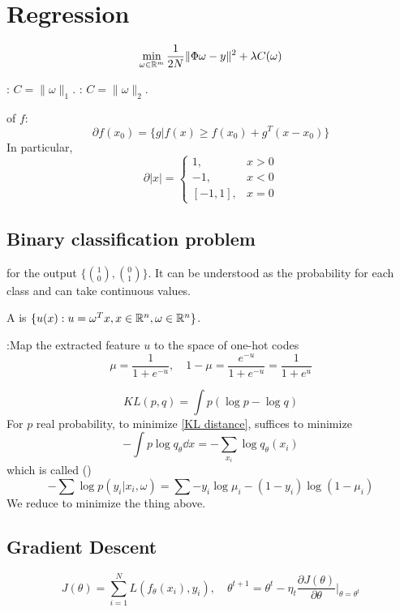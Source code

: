 \section{Regression}
\begin{equation}\label{Lasso}
    \min_{\omega\in \mathbb R^m}\frac{1}{2N}\|\Phi\omega-y\|^2+\lambda C(\omega)
\end{equation}

:  $ C=\|\omega\|_1 $. : $ C=\|\omega\|_2 $.

 of  $ f $:
\[\partial f(x_0)=\{g|f(x) \geq f(x_0)+g^T(x-x_0)\}\] 
In particular, 
\[\partial |x|=\begin{cases}
    1, & x>0\\
    -1, & x<0\\
    [-1,1], & x=0
\end{cases}\]

\subsection{Binary classification problem}
 for the output  $ \{\binom{1}{0},\binom{0}{1} \} $. It can be understood as the probability for each class  and can take continuous values.

A  is  $ \{u(x):u=\omega^Tx,x\in \mathbb R^n,\omega\in \mathbb R^n\} $.

:Map the extracted feature  $ u $ to the space of one-hot codes 
\[\mu=\frac{1}{1+e^{-u}},\quad 1-\mu=\frac{e^{-u}}{1+e^{-u}}=\frac{1}{1+e^{u}}\] 

\begin{equation}\label{KL distance}
    KL(p,q)=\int p(\log p - \log q)
\end{equation}
For  $ p $ real probability, to minimize \eqref{KL distance}, suffices to minimize 
\[-\int p\log q_\theta\dd x=-\sum_{x_i}\log q_\theta(x_i)\] 
which is called  ()
\[-\sum \log p(y_i|x_i,\omega)=\sum -y_i\log \mu_i-(1-y_i)\log (1-\mu_i)\]
We reduce to minimize the thing above.

\subsection{Gradient Descent}
\[J(\theta)=\sum_{i=1}^N L(f_\theta(x_i),y_i),\quad \theta^{t+1}=\theta^t-\eta_t\frac{\partial J(\theta)}{\partial \theta}|_{\theta=\theta^t}\]